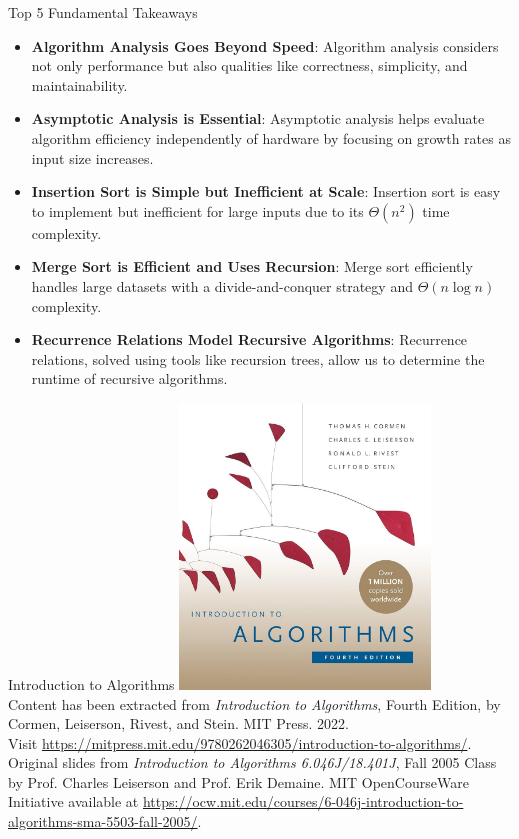 \documentclass{beamer}
\begin{document}
\begin{frame}{Top 5 Fundamental Takeaways}
    \begin{itemize} \pause
        \small
        \item[5] \textbf{Algorithm Analysis Goes Beyond Speed}: Algorithm analysis considers not only performance but also qualities like correctness, simplicity, and maintainability.\pause

        \item[4] \textbf{Asymptotic Analysis is Essential}: Asymptotic analysis helps evaluate algorithm efficiency independently of hardware by focusing on growth rates as input size increases.\pause

        \item[3] \textbf{Insertion Sort is Simple but Inefficient at Scale}: Insertion sort is easy to implement but inefficient for large inputs due to its $\Theta(n^2)$ time complexity.\pause

        \item[2] \textbf{Merge Sort is Efficient and Uses Recursion}: Merge sort efficiently handles large datasets with a divide-and-conquer strategy and $\Theta(n \log n)$ complexity.\pause

        \item[1] \textbf{Recurrence Relations Model Recursive Algorithms}: Recurrence relations, solved using tools like recursion trees, allow us to determine the runtime of recursive algorithms.
    \end{itemize}
\end{frame}


\begin{frame}{Introduction to Algorithms}
    \centering
    \includegraphics[width=0.5\textwidth]{figures/book_cover.jpg} \\
    \vspace{5mm}
    {
        \tiny
        Content has been extracted from \textit{Introduction to Algorithms}, Fourth Edition, by Cormen, Leiserson, Rivest, and Stein. MIT Press. 2022.\\
        Visit \url{https://mitpress.mit.edu/9780262046305/introduction-to-algorithms/}.\\
        Original slides from \textit{Introduction to Algorithms 6.046J/18.401J}, Fall 2005 Class by Prof. Charles Leiserson and Prof. Erik Demaine. MIT OpenCourseWare Initiative available at \url{https://ocw.mit.edu/courses/6-046j-introduction-to-algorithms-sma-5503-fall-2005/}.\\
    }
\end{frame}
\end{document}
